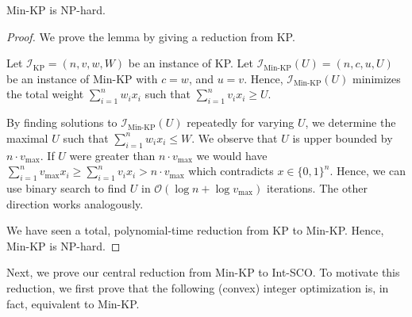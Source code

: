 \begin{lemma}
Min-KP is NP-hard.
\end{lemma}
\begin{proof}
We prove the lemma by giving a reduction from KP.

Let $\mathcal{I}_{\text{KP}} = (n, v, w, W)$ be an instance of KP. Let $\mathcal{I}_{\text{Min-KP}}(U) = (n, c, u, U)$ be an instance of Min-KP with $c = w$, and $u = v$. Hence, $\mathcal{I}_{\text{Min-KP}}(U)$ minimizes the total weight $\sum_{i=1}^n w_i x_i$ such that $\sum_{i=1}^n v_i x_i \geq U$.

By finding solutions to $\mathcal{I}_{\text{Min-KP}}(U)$ repeatedly for varying $U$, we determine the maximal $U$ such that $\sum_{i=1}^n w_i x_i \leq W$. We observe that $U$ is upper bounded by $n \cdot v_{\text{max}}$. If $U$ were greater than $n \cdot v_{\text{max}}$ we would have $\sum_{i=1}^n v_{\text{max}} x_i \geq \sum_{i=1}^n v_i x_i > n \cdot v_{\text{max}}$ which contradicts $x \in \{0,1\}^n$. Hence, we can use binary search to find $U$ in $\mathcal{O}(\log n + \log v_{\text{max}})$ iterations. The other direction works analogously.

We have seen a total, polynomial-time reduction from KP to Min-KP. Hence, Min-KP is NP-hard.
\end{proof}

Next, we prove our central reduction from Min-KP to Int-SCO. To motivate this reduction, we first prove that the following (convex) integer optimization is, in fact, equivalent to Min-KP.

